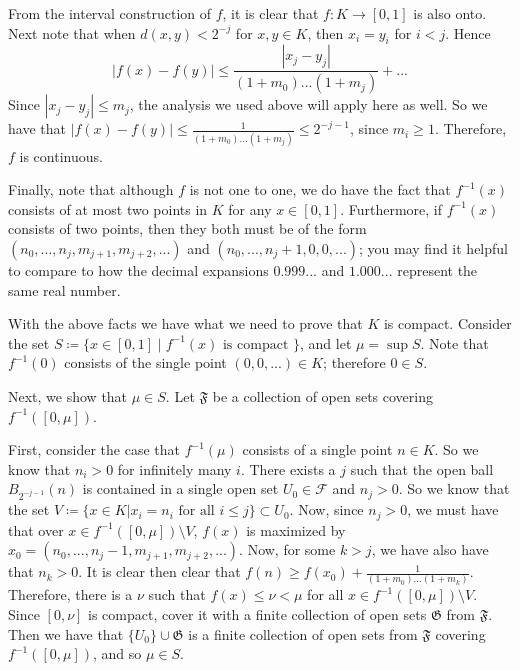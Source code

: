 From the interval construction of \(f\), it is clear that \(f: K \to [0, 1]\) is also onto. Next note that
when \(d(x, y) < 2^{-j}\) for \(x,y \in K\), then \(x_i = y_i\) for \(i < j\). Hence
\begin{equation}
|f(x) - f(y)| \leq \frac{|x_j - y_j|}{(1 + m_0)...(1 + m_j)} + ...
\end{equation} 
Since \(|x_j - y_j| \leq m_j\), the analysis we used above will apply here as well. So we have that
\(|f(x) - f(y)| \leq \frac{1}{(1 + m_0)...(1 + m_j)} \leq 2^{-j-1}\), since \(m_i \geq 1\). Therefore,
\(f\) is continuous.

Finally, note that although \(f\) is not one to one, we do have the fact that \(f^{-1}(x)\) consists of at most
two points in \(K\) for any \(x \in [0, 1]\). Furthermore, if \(f^{-1}(x)\) consists of two points, then
they both must be of the form
\((n_0, ..., n_j, m_{j+1}, m_{j+2}, ...)\) and \((n_0, ..., n_j + 1, 0, 0, ...)\);
you may find it helpful to compare to how the decimal expansions \(0.999...\) and \(1.000...\)
represent the same real number.

With the above facts we have what we need to prove that \(K\) is compact. Consider the set
\(S \coloneqq \{x \in [0, 1] \mid f^{-1}(x) \text{ is compact }\}\), and let \(\mu = \sup S\). Note that
\(f^{-1}(0)\) consists of the single point \((0,0,...)\in K\); therefore \(0 \in S\). 

Next, we show that \(\mu \in S\). Let \(\mathfrak F\) be a collection of open sets covering \(f^{-1}([0, \mu])\).

First, consider the case that \(f^{-1}(\mu)\) consists of a single point \(n \in K\). So we know that
\(n_i > 0\) for infinitely many \(i\). There exists a \(j\) such that the open ball \(B_{2^{-j-1}}(n)\) is
contained in a single open set \(U_0 \in \mathcal F\) and \(n_j > 0\). So we know that the set 
\(V \coloneqq \{x \in K | x_i = n_i \text{ for all } i\leq j\} \subset U_0\). Now, since \(n_j > 0\), we
must have that over \(x \in f^{-1}([0, \mu]) \setminus V\), \(f(x)\) is maximized by 
\(x_0 = (n_0, ..., n_j - 1, m_{j+1}, m_{j+2}, ...)\). Now, for some \(k > j\), we have also have that \(n_k > 0\).
It is clear then clear that \(f(n) \geq f(x_0) + \frac{1}{(1+m_0)...(1+m_k)}\). Therefore, there is a
\(\nu\) such that \(f(x) \leq \nu < \mu\) for all \(x \in f^{-1}([0, \mu]) \setminus V\).
Since \([0, \nu]\) is compact, cover it with a
finite collection of open sets \(\mathfrak G\) from \(\mathfrak F\). Then we have that
\(\{U_0\} \cup \mathfrak G\) is a finite collection of open sets from \(\mathfrak F\) covering
\(f^{-1}([0, \mu])\), and so \(\mu \in S\). 

